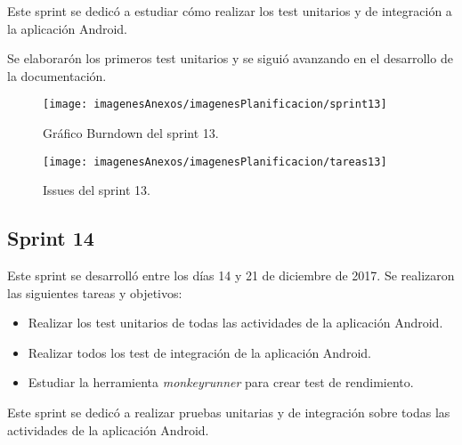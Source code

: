 Este sprint se dedicó a estudiar cómo realizar los test unitarios y de integración a la aplicación Android.

Se elaborarón los primeros test unitarios y se siguió avanzando en el desarrollo de la documentación.

\begin{figure}[h]
    \begin{center}%
        \begin{center}%
          \texttt{[image: imagenesAnexos/imagenesPlanificacion/sprint13]}%
          \caption{Gráfico Burndown del sprint 13.}%
          \label{figSprint13}%
        \end{center}%
  	\end{center}%
\end{figure}%

\begin{figure}[h]
    \begin{center}%
        \begin{center}%
          \texttt{[image: imagenesAnexos/imagenesPlanificacion/tareas13]}%
          \caption{Issues del sprint 13.}%
          \label{figTareas13}%
        \end{center}%
  	\end{center}%
\end{figure}%

\newpage

\subsection{Sprint 14}

Este sprint se desarrolló entre los días 14 y 21 de diciembre de 2017. Se realizaron las siguientes tareas y objetivos:

\begin{itemize}
	\item Realizar los test unitarios de todas las actividades de la aplicación Android.
	\item Realizar todos los test de integración de la aplicación Android.
	\item Estudiar la herramienta \textit{monkeyrunner} para crear test de rendimiento.
\end{itemize}

Este sprint se dedicó a realizar pruebas unitarias y de integración sobre todas las actividades de la aplicación Android.

